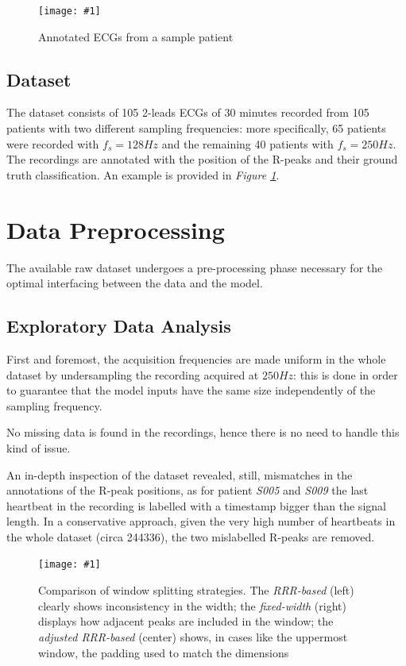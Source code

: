 \documentclass[conference]{IEEEtran}
\newcommand{\fig}[1]{\textit{Figure \ref{#1}}}
\newcommand{\addfigure}[3]{
    \begin{figure}
        \texttt{[image: \#1]}
        \caption{#2}
        \label{#3}
    \end{figure}
}
\begin{document}
    \addfigure
        {img/example.jpg}
        {Annotated ECGs from a sample patient}
        {fig:examples}

\subsection{Dataset}
    The dataset consists of 105 2-leads ECGs of 30 minutes recorded from 105 patients
    with two different sampling frequencies: more specifically, 65 patients were
    recorded with $f_s = 128 Hz$ and the remaining 40 patients with $f_s =
    250Hz$. The recordings are annotated with the position of the R-peaks and
    their ground truth classification. An example is provided in \fig{fig:examples}.

\section{Data Preprocessing}
    The available raw dataset undergoes a pre-processing phase necessary for the
    optimal interfacing between the data and the model. 

\subsection{Exploratory Data Analysis}
    First and foremost, the acquisition frequencies are made uniform in the
    whole dataset by undersampling the recording acquired at $250Hz$: this is
    done in order to guarantee that the model inputs have the same size
    independently of the sampling frequency.  

    No missing data is found in the recordings, hence there is no need
    to handle this kind of issue.
    

    An in-depth inspection of the dataset revealed, still, mismatches in the
    annotations of the R-peak positions, as for patient \textit{S005} and
    \textit{S009} the last heartbeat in the recording is labelled with a
    timestamp bigger than the signal length. In a conservative approach, given
    the very high number of heartbeats in the whole dataset (circa 244336), the
    two mislabelled R-peaks are removed.

    \addfigure
        {img/windowing.jpg}
        {Comparison of window splitting strategies. The \textit{RRR-based} (left) clearly shows
        inconsistency in the width; the \textit{fixed-width} (right) displays how
        adjacent peaks are included in the window; the \textit{adjusted RRR-based}
        (center) shows, in cases like the uppermost window, the padding used to match
        the dimensions}
        {fig:windowing}
\end{document}
